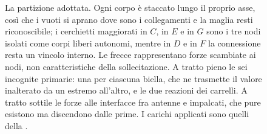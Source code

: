 \begin{figure}[htbp]
	\caption{La partizione adottata. Ogni corpo è staccato
		lungo il proprio asse, così che i vuoti si aprano dove
		sono i collegamenti e la maglia resti riconoscibile; i
		cerchietti maggiorati in $C$, in $E$ e in $G$ sono i tre
		nodi isolati come corpi liberi autonomi, mentre in $D$ e
		in $F$ la connessione resta un vincolo interno. Le frecce
		rappresentano forze scambiate ai nodi, non
		caratteristiche della sollecitazione. A tratto pieno le
		sei incognite primarie: una per ciascuna biella, che ne
		trasmette il valore inalterato da un estremo all'altro, e
		le due reazioni dei carrelli. A tratto sottile le forze
		alle interfacce fra antenne e impalcati, che pure
		esistono ma discendono dalle prime. I carichi applicati
		sono quelli della .}
	\label{fig:strallato_esploso}
\end{figure}
